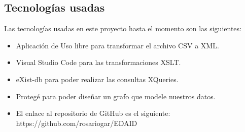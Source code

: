 \documentclass[../main.tex]{subfiles}
\begin{document}
\subsection{Tecnologías usadas}
Las tecnologías usadas en este proyecto hasta el momento son las siguientes:
\begin{itemize}
    \item Aplicación de Uso libre para transformar el archivo CSV a XML.
    \item Visual Studio Code para las transformaciones XSLT.
    \item eXist-db para poder realizar las consultas XQueries.
    \item Protegé para poder diseñar un grafo que modele nuestros datos.
    \item El enlace al repositorio de GitHub es el siguiente: https://github.com/rosariogar/EDAID
    
\end{itemize}
\end{document}
